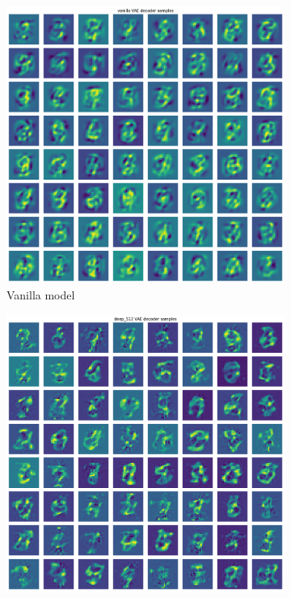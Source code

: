 \documentclass[a4paper,11pt]{article}
\begin{document}
\begin{figure}[ht]
    \centering
    \begin{subfigure}[t]{0.35\textwidth}
        \includegraphics[width=\textwidth]{../images/decoder_vanilla.png}
        \caption{Vanilla model}
    \end{subfigure}
    \hfill
    \begin{subfigure}[t]{0.35\textwidth}
        \includegraphics[width=\textwidth]{../images/decoder_512.png}

\end{subfigure}
\end{figure}
\end{document}
